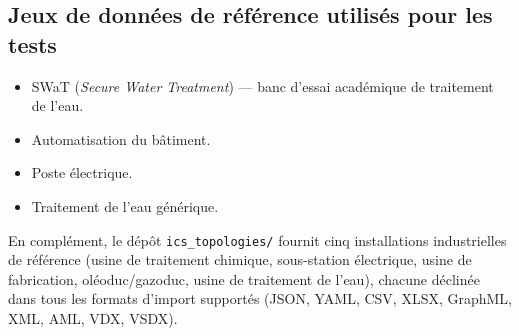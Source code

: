 \documentclass[12pt,a4paper]{article}
\newcommand{\forcereset}[1]{}
\begin{document}
\subsection{Jeux de données de référence utilisés pour les tests}
\forcereset{5}

\begin{itemize}[leftmargin=1.2cm, itemsep=0.2\baselineskip]
    \item SWaT (\emph{Secure Water Treatment}) --- banc d'essai académique de traitement de l'eau.
    \item Automatisation du bâtiment.
    \item Poste électrique.
    \item Traitement de l'eau générique.
\end{itemize}

En complément, le dépôt \texttt{ics\_topologies/} fournit cinq installations industrielles de référence (usine de traitement chimique, sous-station électrique, usine de fabrication, oléoduc/gazoduc, usine de traitement de l'eau), chacune déclinée dans tous les formats d'import supportés (JSON, YAML, CSV, XLSX, GraphML, XML, AML, VDX, VSDX).
\end{document}
